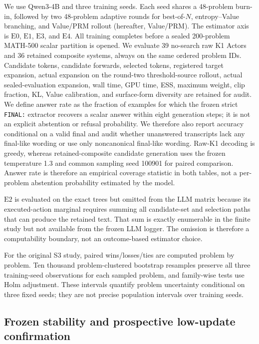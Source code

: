\documentclass[10pt]{article}
\newcommand{\Ezero}{\ensuremath{\mathrm{E0}}}
\newcommand{\Eone}{\ensuremath{\mathrm{E1}}}
\newcommand{\Etwo}{\ensuremath{\mathrm{E2}}}
\newcommand{\Ethree}{\ensuremath{\mathrm{E3}}}
\newcommand{\Efour}{\ensuremath{\mathrm{E4}}}
\begin{document}
We use Qwen3-4B and three training seeds.  Each seed shares a 48-problem
burn-in, followed by two 48-problem adaptive rounds for best-of-$N$,
entropy--Value branching, and Value/PRM rollout (hereafter,
Value/PRM).  The estimator axis is
\Ezero, \Eone, \Ethree, and \Efour.  All training completes before a sealed
200-problem MATH-500 scalar partition is opened.  We evaluate 39 no-search raw
K1 Actors and 36 retained composite systems, always on the same ordered problem
IDs.  Candidate tokens, candidate forwards, selected tokens, registered target
expansion, actual expansion on the round-two threshold-source rollout, actual
sealed-evaluation expansion, wall time, GPU time, ESS, maximum weight, clip fraction, KL, Value
calibration, and surface-form diversity are retained for audit.
We define answer rate as the fraction of examples for which the frozen strict
\texttt{FINAL:} extractor recovers a scalar answer within eight generation
steps; it is not an explicit abstention or refusal probability.  We therefore
also report accuracy conditional on a valid final and audit whether unanswered
transcripts lack any final-like wording or use only noncanonical final-like
wording.
Raw-K1 decoding is greedy, whereas retained-composite candidate generation uses
the frozen temperature 1.3 and common sampling seed 100901 for paired
comparison.  Answer rate is therefore an empirical coverage statistic in both
tables, not a per-problem abstention probability estimated by the model.

\Etwo{} is evaluated on the exact trees but omitted from the LLM matrix because
its executed-action marginal requires summing all candidate-set and selection
paths that can produce the retained text.  That sum is exactly enumerable in
the finite study but not available from the frozen LLM logger.  The omission is
therefore a computability boundary, not an outcome-based estimator choice.

For the original S3 study, paired wins/losses/ties are computed problem
by problem.  Ten thousand problem-clustered bootstrap resamples preserve all
three training-seed observations for each sampled problem, and family-wise
tests use Holm adjustment.  These intervals quantify problem uncertainty
conditional on three fixed seeds; they are not precise population intervals
over training seeds.

\subsection{Frozen stability and prospective low-update confirmation}
\end{document}
